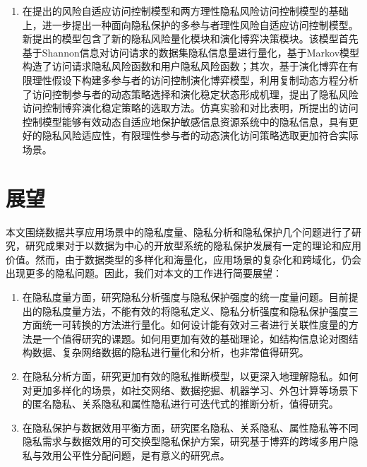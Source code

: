 \begin{enumerate}
	\item 在提出的风险自适应访问控制模型和两方理性隐私风险访问控制模型的基础上，进一步提出一种面向隐私保护的多参与者理性风险自适应访问控制模型。新提出的模型包含了新的隐私风险量化模块和演化博弈决策模块。该模型首先基于Shannon信息对访问请求的数据集隐私信息量进行量化，基于Markov模型构造了访问请求隐私风险函数和用户隐私风险函数；其次，基于演化博弈在有限理性假设下构建多参与者的访问控制演化博弈模型，利用复制动态方程分析了访问控制参与者的动态策略选择和演化稳定状态形成机理，提出了隐私风险访问控制博弈演化稳定策略的选取方法。仿真实验和对比表明，所提出的访问控制模型能够有效动态自适应地保护敏感信息资源系统中的隐私信息，具有更好的隐私风险适应性，有限理性参与者的动态演化访问策略选取更加符合实际场景。
	
\end{enumerate}

\section{展望}
   本文围绕数据共享应用场景中的隐私度量、隐私分析和隐私保护几个问题进行了研究，研究成果对于以数据为中心的开放型系统的隐私保护发展有一定的理论和应用价值。然而，由于数据类型的多样化和海量化，应用场景的复杂化和跨域化，仍会出现更多的隐私问题。因此，我们对本文的工作进行简要展望：
\begin{enumerate}
	\item 在隐私度量方面，研究隐私分析强度与隐私保护强度的统一度量问题。目前提出的隐私度量方法，不能有效的将隐私定义、隐私分析强度和隐私保护强度三方面统一可转换的方法进行量化。如何设计能有效对三者进行关联性度量的方法是一个值得研究的课题。如何用更加有效的基础理论，如结构信息论对图结构数据、复杂网络数据的隐私进行量化和分析，也非常值得研究。
	
	\item 在隐私分析方面，研究更加有效的隐私推断模型，以更深入地理解隐私。如何对更加多样化的场景，如社交网络、数据挖掘、机器学习、外包计算等场景下的匿名隐私、关系隐私和属性隐私进行可迭代式的推断分析，值得研究。
	
	\item 在隐私保护与数据效用平衡方面，研究匿名隐私、关系隐私、属性隐私等不同隐私需求与数据效用的可交换型隐私保护方案，研究基于博弈的跨域多用户隐私与效用公平性分配问题，是有意义的研究点。

\end{enumerate}

